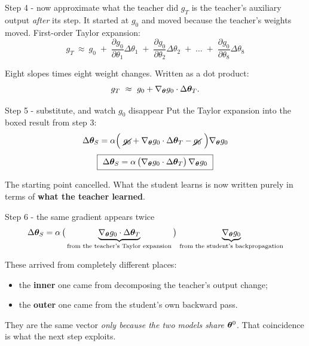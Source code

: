 \documentclass[aspectratio=169]{beamer}
\begin{document}
\begin{frame}{Step 4 - now approximate what the teacher did}
  $g_T$ is the teacher's auxiliary output \emph{after} its step. It started at $g_0$ and
  moved because the teacher's weights moved. First-order Taylor expansion:
  \[
    g_T \ \approx\ g_0 \;+\; \frac{\partial g_0}{\partial \theta_1}\Delta\theta_1
      \;+\; \frac{\partial g_0}{\partial \theta_2}\Delta\theta_2 \;+\; \dots
      \;+\; \frac{\partial g_0}{\partial \theta_8}\Delta\theta_8
  \]

  \medskip
  Eight slopes times eight weight changes. Written as a dot product:
  \[
    g_T \ \approx\ g_0 + \nabla_{\bm{\theta}} g_0 \cdot \Delta\bm{\theta}_T .
  \]
\end{frame}

\begin{frame}{Step 5 - substitute, and watch $g_0$ disappear}
  Put the Taylor expansion into the boxed result from step 3:
  \[
    \Delta\bm{\theta}_S
      = \alpha\Big(\ \cancel{g_0} + \nabla_{\bm{\theta}} g_0 \cdot \Delta\bm{\theta}_T
        - \cancel{g_0}\ \Big)\nabla_{\bm{\theta}} g_0
  \]
  \[
    \boxed{\ \Delta\bm{\theta}_S
      = \alpha\,\big(\nabla_{\bm{\theta}} g_0 \cdot \Delta\bm{\theta}_T\big)\,
        \nabla_{\bm{\theta}} g_0\ }
  \]

  \medskip
  \begin{tcolorbox}[colback=paramgreen!8, colframe=paramgreen, boxrule=0.6pt, arc=2pt]
    The starting point cancelled. What the student learns is now written purely in terms
    of \textbf{what the teacher learned}.
  \end{tcolorbox}
\end{frame}

\begin{frame}{Step 6 - the same gradient appears twice}
  \[
    \Delta\bm{\theta}_S
      = \alpha\,\big(\underbrace{\nabla_{\bm{\theta}} g_0 \cdot
        \Delta\bm{\theta}_T}_{\text{from the teacher's Taylor expansion}}\big)\,
        \underbrace{\nabla_{\bm{\theta}} g_0}_{\text{from the student's backpropagation}}
  \]

  \bigskip
  These arrived from completely different places:

  \medskip
  \begin{itemize}
    \item the \textbf{inner} one came from decomposing the teacher's output change;
    \item the \textbf{outer} one came from the student's own backward pass.
  \end{itemize}

  \bigskip
  They are the same vector \emph{only because the two models share $\bm{\theta}^0$}. That
  coincidence is what the next step exploits.
\end{frame}
\end{document}
